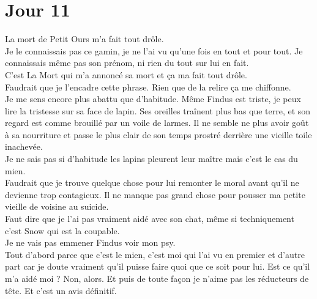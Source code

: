 \chapter*{Jour 11}
La mort de Petit Ours m'a fait tout drôle. \\
Je le connaissais pas ce gamin, je ne l'ai vu qu'une fois en tout et pour tout. Je connaissais même pas son prénom, ni rien du tout sur lui en fait. \\
C'est La Mort qui m'a annoncé sa mort et ça ma fait tout drôle. \\

Faudrait que je l'encadre cette phrase. Rien que de la relire ça me chiffonne. \\

Je me sens encore plus abattu que d'habitude. Même Findus est triste, je peux lire la tristesse sur sa face de lapin. Ses oreilles traînent plus bas que terre, et son regard est comme brouillé par un voile de larmes. Il ne semble ne plus avoir goût à sa nourriture et passe le plus clair de son temps prostré derrière une vieille toile inachevée. \\
Je ne sais pas si d'habitude les lapins pleurent leur maître mais c'est le cas du mien. \\

Faudrait que je trouve quelque chose pour lui remonter le moral avant qu'il ne devienne trop contagieux. Il ne manque pas grand chose pour pousser ma petite vieille de voisine au suicide. \\
Faut dire que je l'ai pas vraiment aidé avec son chat, même si techniquement c'est Snow qui est la coupable. \\

Je ne vais pas emmener Findus voir mon psy. \\
Tout d'abord parce que c'est le mien, c'est moi qui l'ai vu en premier et d'autre part car je doute vraiment qu'il puisse faire quoi que ce soit pour lui. Est ce qu'il m'a aidé moi ? Non, alors. Et puis de toute façon je n'aime pas les réducteurs de tête. Et c'est un avis définitif.